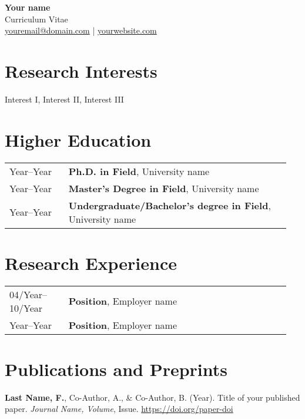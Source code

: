 \documentclass[11pt, a4paper, colorlinks=true, linkcolor=blue, citecolor=blue, urlcolor=blue]{article}
\begin{document}
\begin{center}
    {\Huge \textbf{{Your name}}}\\
    \vspace{2mm}
    {\Large \textcolor{subtitlecolor}{Curriculum Vitae}}\\
    \vspace{2mm}
    \href{mailto:youremail@domain.com}{youremail@domain.com} | \href{yourwebsite.com}{yourwebsite.com}
\end{center}

\section*{Research Interests}
Interest I, Interest II, Interest III


\section*{Higher Education}
\begin{tabular}{p{0.2\linewidth} p{0.75\linewidth}} %
Year--Year & \textbf{Ph.D. in Field}, University name \\
Year--Year & \textbf{Master's Degree in Field}, University name \\
Year--Year & \textbf{Undergraduate/Bachelor's degree in Field}, University name \\
\end{tabular}

\section*{Research Experience}
\begin{tabular}{p{0.2\linewidth} p{0.75\linewidth}}
04/Year--10/Year & \textbf{Position}, Employer name \\
Year--Year & \textbf{Position}, Employer name \\
\end{tabular}

\section*{Publications and Preprints}
    \textbf{Last Name, F.}, Co-Author, A., \& Co-Author, B. (Year). Title of your published paper. \textit{Journal Name, Volume}, Issue. \href{https://doi.org/paper-doi}{https://doi.org/paper-doi}\\ 
    
\end{document}
